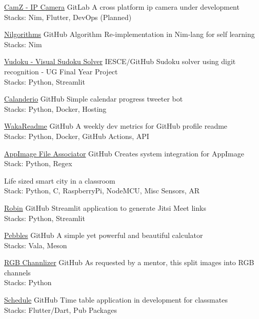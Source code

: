 \documentclass[
	a4paper,
]{fortysecondscv}
\begin{document}
\begin{cvtable}[2]
    
    {\href{https://gitlab.com/ipcam}{CamZ - IP Camera}}
    {GitLab}
    {A cross platform ip camera under development\\
    Stacks: Nim, Flutter, DevOps (Planned)}
    
    {\href{https://github.com/joe733/nilgorithms}{Nilgorithms}}
    {GitHub}
    {Algorithm Re-implementation in Nim-lang for self learning\\
    Stacks: Nim}

    {\href{https://github.com/joe733/vudoku}{Vudoku - Visual Sudoku Solver}}
    {IESCE$/$GitHub}
    {Sudoku solver using digit recognition - UG Final Year Project\\
    Stacks: Python, Streamlit}
    
    {\href{https://github.com/joe733/Calendario/}{Calanderio}}
    {GitHub}
	{Simple calendar progress tweeter bot\\
	Stacks: Python, Docker, Hosting}
	
	{\href{https://github.com/athul/waka-readme}{WakaReadme}}
	{GitHub}
	{A weekly dev metrics for GitHub profile readme\\
	Stacks: Python, Docker, GitHub Actions, API}
	
	{\href{https://github.com/joe733/appimage_file_associator}{AppImage File Associator}}
	{GitHub}
	{Creates system integration for AppImage\\
	Stack: Python, Regex}
	
	{Life sized smart city in a classroom\\
	Stack: Python, C, RaspberryPi, NodeMCU, Misc Sensors, AR}
	
	{\href{https://github.com/joe733/robin}{Robin}}
	{GitHub}
	{Streamlit application to generate Jitsi Meet links\\
	Stacks: Python, Streamlit}
	
	{\href{https://github.com/joe733/pebbles}{Pebbles}}
	{GitHub}
	{A simple yet powerful and beautiful calculator\\
	Stacks: Vala, Meson}
	
	{\href{https://github.com/joe733/eye-defect/}{RGB Channlizer}}
	{GitHub}
	{As requested by a mentor, this split images into RGB channels\\
	Stacks: Python}
	
	{\href{https://github.com/joe733/schedule}{Schedule}}
	{GitHub}
	{Time table application in development for classmates\\
	Stacks: Flutter$/$Dart, Pub Packages}
\end{cvtable}
\end{document}
